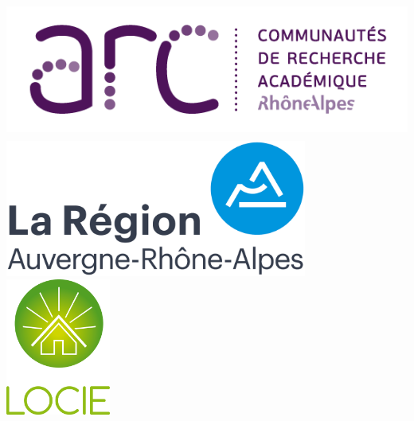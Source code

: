 \documentclass[a0,portrait]{a0poster}
\begin{document}
\begin{minipage}[b]{0.5\linewidth}
\begin{flushright}
	\includegraphics[height=4.5cm]{logo-arc-72dpi}
    \hspace{1cm}
    \includegraphics[height=4.5cm]{logo-ara}
	\hspace{1cm}
	\includegraphics[height=4.5cm]{locie-logo}
\end{flushright}
\vspace{10cm}
\end{minipage}

\vspace{.5cm}

\color{DarkSlateGray}
\end{document}
